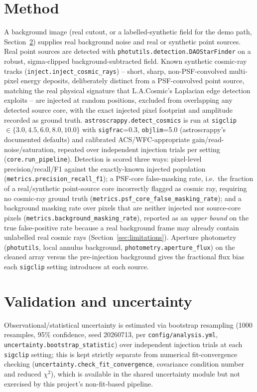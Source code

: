 \documentclass[11pt]{article}
\begin{document}
\section{Method}
\label{sec:method}
A background image (real cutout, or a labelled-synthetic field for the demo
path, Section~\ref{sec:validation}) supplies real background noise and real
or synthetic point sources. Real point sources are detected with
\texttt{photutils.detection.DAOStarFinder} on a robust, sigma-clipped
background-subtracted field. Known synthetic cosmic-ray tracks
(\texttt{inject.inject\_cosmic\_rays}) -- short, sharp, non-PSF-convolved
multi-pixel energy deposits, deliberately distinct from a PSF-convolved point
source, matching the real physical signature that L.A.Cosmic's Laplacian
edge detection exploits -- are injected at random positions, excluded from
overlapping any detected source core, with the exact injected pixel footprint
and amplitude recorded as ground truth. \texttt{astroscrappy.detect\_cosmics}
is run at \texttt{sigclip} $\in \{3.0, 4.5, 6.0, 8.0, 10.0\}$ with
\texttt{sigfrac}=0.3, \texttt{objlim}=5.0 (astroscrappy's documented
defaults) and calibrated ACS/WFC-appropriate gain/read-noise/saturation,
repeated over independent injection trials per setting
(\texttt{core.run\_pipeline}). Detection is scored three ways: pixel-level
precision/recall/F1 against the exactly-known injected population
(\texttt{metrics.precision\_recall\_f1}); a PSF-core false-masking rate,
i.e.\ the fraction of a real/synthetic point-source core incorrectly flagged
as cosmic ray, requiring no cosmic-ray ground truth
(\texttt{metrics.psf\_core\_false\_masking\_rate}); and a background masking
rate over pixels that are neither injected nor source-core pixels
(\texttt{metrics.background\_masking\_rate}), reported as an \emph{upper
bound} on the true false-positive rate because a real background frame may
already contain unlabelled real cosmic rays (Section~\ref{sec:limitations}).
Aperture photometry (\texttt{photutils}, local annulus background,
\texttt{photometry.aperture\_flux}) on the cleaned array versus the
pre-injection background gives the fractional flux bias each \texttt{sigclip}
setting introduces at each source.

\section{Validation and uncertainty}
\label{sec:validation}
Observational/statistical uncertainty is estimated via bootstrap resampling
(1000 resamples, 95\% confidence, seed 20260713, per
\texttt{config/analysis.yml}, \texttt{uncertainty.bootstrap\_statistic}) over
independent injection trials at each \texttt{sigclip} setting; this is kept
strictly separate from numerical fit-convergence checking
(\texttt{uncertainty.check\_fit\_convergence}, covariance condition number
and reduced $\chi^2$), which is available in the shared uncertainty module
but not exercised by this project's non-fit-based pipeline.
\end{document}
